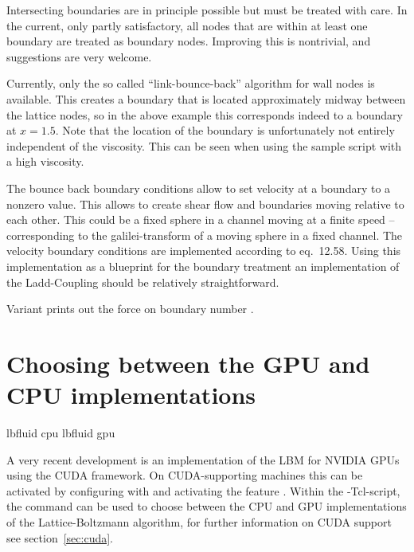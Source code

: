 Intersecting boundaries are in principle possible but must be treated
with care. 
In the current, only partly satisfactory, all nodes that are within at least
one boundary are treated as boundary nodes. Improving this is nontrivial, 
and suggestions are very welcome.

Currently, only the so called ``link-bounce-back'' algorithm for wall
nodes is available. This creates a boundary that is located
approximately midway between the lattice nodes, so in the above
example this corresponds indeed to a boundary at $x=1.5$. Note that
the location of the boundary is unfortunately not entirely independent of the
viscosity. This can \eg be seen when using the sample script
 with a high viscosity.

The bounce back boundary conditions allow to set velocity at a boundary to a nonzero
value. This allows to create shear flow and boundaries moving relative to 
each other. This could be a fixed sphere in a channel moving at a finite speed -- 
corresponding to the galilei-transform of a moving sphere in a fixed channel.
The velocity boundary conditions are implemented according to \cite{succi01a}
eq.~12.58. Using this implementation as a blueprint for the boundary treatment 
an implementation of the Ladd-Coupling should be relatively straightforward.

Variant  prints out the force on boundary number
.

\section{Choosing between the GPU and CPU implementations}
\begin{essyntax}
   lbfluid cpu
   lbfluid gpu
  \begin{features}
  \end{features}
\end{essyntax}

A very recent development is an implementation of the LBM for NVIDIA
GPUs using the CUDA framework.  On CUDA-supporting machines this can
be activated by configuring with  and activating the feature .
Within the \es-Tcl-script, the  command can be used to
choose between the CPU and GPU implementations of the
Lattice-Boltzmann algorithm, for further information on CUDA support
see section~\ref{sec:cuda}.

